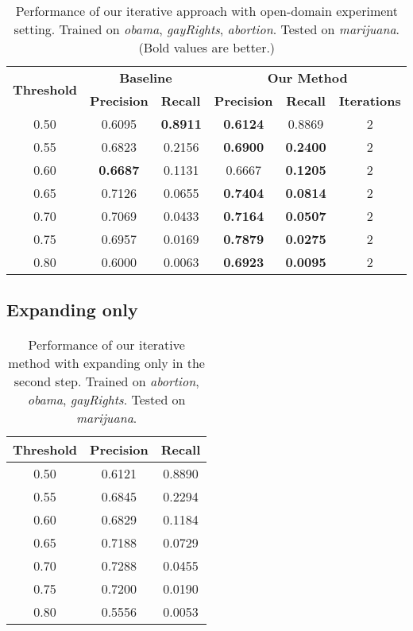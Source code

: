 \documentclass[11pt,a4paper]{article}
\begin{document}
\begin{table*}[h]
\begin{center}
\begin{tabular}{|c||c|c|c|c|c|}
\hline
\multicolumn{1}{|c|}{\multirow{2}{*}{\bf Threshold}} & \multicolumn{2}{c|}{\bf Baseline}  & \multicolumn{3}{c|}{\bf Our Method}    \\ \cline{2-6} 
\multicolumn{1}{|c|}{}   & \multicolumn{1}{l|}{\bf Precision} & \multicolumn{1}{l|}{\bf Recall} & \multicolumn{1}{l|}{\bf Precision} & \multicolumn{1}{c|}{\bf Recall} & \multicolumn{1}{l|}{\bf Iterations} \\ \hline
 \hline
0.50 & 0.6095 &\bf 0.8911 &\bf 0.6124 & 0.8869 & 2 \\
0.55 & 0.6823 & 0.2156 &\bf 0.6900 &\bf 0.2400 & 2 \\
0.60 &\bf 0.6687 & 0.1131 & 0.6667 &\bf 0.1205 & 2 \\
0.65 & 0.7126 & 0.0655 &\bf 0.7404 &\bf 0.0814 & 2 \\
0.70 & 0.7069 & 0.0433 &\bf 0.7164 &\bf 0.0507 & 2 \\
0.75 & 0.6957 & 0.0169 &\bf 0.7879 &\bf 0.0275 & 2 \\
0.80 & 0.6000 & 0.0063 &\bf 0.6923 &\bf 0.0095 & 2
\\\hline
\end{tabular}
\end{center}
\caption{\label{tab:cross-marijuana} Performance of our iterative approach with open-domain experiment setting. Trained on {\it obama}, {\it gayRights}, {\it abortion}. Tested on {\it marijuana}. (Bold values are better.)}
\end{table*}


\subsection{Expanding only}

\begin{table}[h]
\begin{center}
\begin{tabular}{|c||c|c|}
\hline \bf Threshold & \bf Precision & \bf Recall \\ \hline\hline
0.50 & 0.6121 & 0.8890 \\
0.55 & 0.6845 & 0.2294 \\
0.60 & 0.6829 & 0.1184 \\
0.65 & 0.7188 & 0.0729 \\
0.70 & 0.7288 & 0.0455 \\
0.75 & 0.7200 & 0.0190 \\
0.80 & 0.5556 & 0.0053 \\ 
\hline
\end{tabular}
\end{center}
\caption{\label{tab:expanding} Performance of our iterative method with expanding only in the second step. Trained on {\it abortion}, {\it obama}, {\it gayRights}. Tested on {\it marijuana}.}
\end{table}
\end{document}
